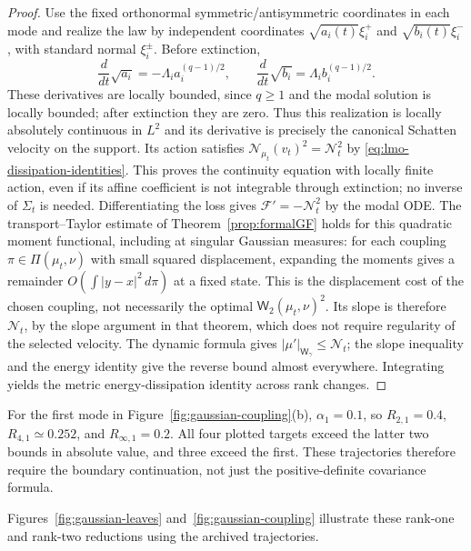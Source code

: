 \documentclass{article}
\newcommand{\MF}{\mathcal{F}}
\newcommand{\MN}{\mathcal{N}}
\newcommand{\Wtwo}{\mathsf{W}_2}
\newcommand{\Wg}{\mathsf{W}_{\gamma}}
\begin{document}
\begin{proof}
Use the fixed orthonormal symmetric/antisymmetric coordinates in each
mode and realize the law by independent coordinates
$\sqrt{a_i(t)}\xi_i^+$ and $\sqrt{b_i(t)}\xi_i^-$, with standard normal
$\xi_i^\pm$. Before extinction,
$$
 \frac{d}{dt}\sqrt{a_i}=-\Lambda_i a_i^{(q-1)/2},
 \qquad
 \frac{d}{dt}\sqrt{b_i}=\Lambda_i b_i^{(q-1)/2}.
$$
These derivatives are locally bounded, since $q\ge1$ and the modal
solution is locally bounded; after extinction they are zero. Thus this
realization is locally absolutely continuous in $L^2$ and its derivative
is precisely the canonical Schatten velocity on the support. Its action
satisfies $\MN_{\mu_t}(v_t)^2=\mathcal N_t^2$ by
\eqref{eq:lmo-dissipation-identities}. This proves the continuity equation
with locally finite action, even if its affine coefficient is not integrable
through extinction; no inverse of $\Sigma_t$ is needed.
Differentiating the loss gives $\MF'=-\mathcal N_t^2$ by the modal ODE.
The transport--Taylor estimate of
Theorem~\ref{prop:formalGF} holds for this quadratic
moment functional, including at singular Gaussian measures: for each coupling
$\pi\in\Pi(\mu_t,\nu)$ with small squared displacement, expanding the
moments gives a remainder $O(\int|y-x|^2\,d\pi)$ at a fixed state.
This is the displacement cost of the chosen coupling, not necessarily the
optimal $\Wtwo(\mu_t,\nu)^2$.
Its slope is therefore $\mathcal N_t$, by the slope argument in that
theorem, which does not require regularity of the selected velocity.
The dynamic formula gives $|\mu'|_{\Wg}\le\mathcal N_t$; the slope
inequality and the energy identity give the reverse bound almost everywhere.
Integrating yields the metric energy-dissipation identity across rank changes.
\end{proof}

For the first mode in Figure~\ref{fig:gaussian-coupling}(b), $\alpha_1=0.1$,
so $R_{2,1}=0.4$, $R_{4,1}\simeq0.252$, and $R_{\infty,1}=0.2$.
All four plotted targets exceed the latter two bounds in absolute value,
and three exceed the first. These trajectories therefore require the
boundary continuation, not just the positive-definite covariance formula.

Figures~\ref{fig:gaussian-leaves} and~\ref{fig:gaussian-coupling} illustrate
these rank-one and rank-two reductions using the archived trajectories.
\end{document}
